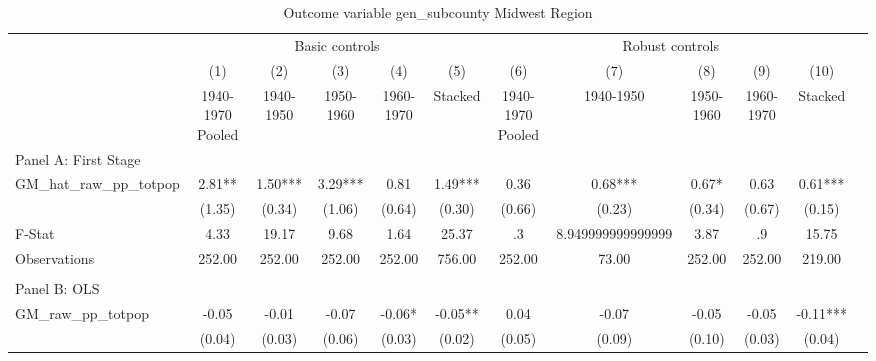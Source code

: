  \begin{table}[htbp]\centering {} \begin{threeparttable} \caption{Outcome variable gen\_subcounty Midwest Region} \begin{tabular}{l*{11}{c}} \toprule
          &\multicolumn{5}{c}{Basic controls}                                   &\multicolumn{5}{c}{Robust controls}                                  \\\cmidrule(lr){2-6}\cmidrule(lr){7-11}
          &\multicolumn{1}{c}{(1)}&\multicolumn{1}{c}{(2)}&\multicolumn{1}{c}{(3)}&\multicolumn{1}{c}{(4)}&\multicolumn{1}{c}{(5)}&\multicolumn{1}{c}{(6)}&\multicolumn{1}{c}{(7)}&\multicolumn{1}{c}{(8)}&\multicolumn{1}{c}{(9)}&\multicolumn{1}{c}{(10)}\\
          &\multicolumn{1}{c}{1940-1970 Pooled}&\multicolumn{1}{c}{1940-1950}&\multicolumn{1}{c}{1950-1960}&\multicolumn{1}{c}{1960-1970}&\multicolumn{1}{c}{Stacked}&\multicolumn{1}{c}{1940-1970 Pooled}&\multicolumn{1}{c}{1940-1950}&\multicolumn{1}{c}{1950-1960}&\multicolumn{1}{c}{1960-1970}&\multicolumn{1}{c}{Stacked}\\
\cmidrule(lr){1-11}
\multicolumn{10}{l}{Panel A: First Stage}\\
\cmidrule(lr){1-11}
GM\_hat\_raw\_pp\_totpop&      2.81** &      1.50***&      3.29***&      0.81   &      1.49***&      0.36   &      0.68***&      0.67*  &      0.63   &      0.61***\\
          &    (1.35)   &    (0.34)   &    (1.06)   &    (0.64)   &    (0.30)   &    (0.66)   &    (0.23)   &    (0.34)   &    (0.67)   &    (0.15)   \\
\midrule
F-Stat    &      4.33   &     19.17   &      9.68   &      1.64   &     25.37   &        .3   &8.949999999999999   &      3.87   &        .9   &     15.75   \\
Observations&    252.00   &    252.00   &    252.00   &    252.00   &    756.00   &    252.00   &     73.00   &    252.00   &    252.00   &    219.00   \\
\cmidrule[\heavyrulewidth](lr){1-11} \\ \cmidrule[\heavyrulewidth](lr){1-11}
\multicolumn{10}{l}{Panel B: OLS}\\
\cmidrule(lr){1-11}
GM\_raw\_pp\_totpop&     -0.05   &     -0.01   &     -0.07   &     -0.06*  &     -0.05** &      0.04   &     -0.07   &     -0.05   &     -0.05   &     -0.11***\\
          &    (0.04)   &    (0.03)   &    (0.06)   &    (0.03)   &    (0.02)   &    (0.05)   &    (0.09)   &    (0.10)   &    (0.03)   &    (0.04)   \\

\end{tabular}
\end{threeparttable}
\end{table}
